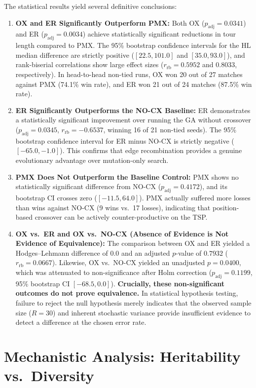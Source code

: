 \documentclass[10pt,a4paper]{article}
\begin{document}
The statistical results yield several definitive conclusions:
\begin{enumerate}
    \item \textbf{OX and ER Significantly Outperform PMX:} Both OX ($p_{\text{adj}} = 0.0341$) and ER ($p_{\text{adj}} = 0.0034$) achieve statistically significant reductions in tour length compared to PMX. The 95\% bootstrap confidence intervals for the HL median difference are strictly positive ($[22.5, 101.0]$ and $[35.0, 93.0]$), and rank-biserial correlations show large effect sizes ($r_{\text{rb}} = 0.5952$ and $0.8033$, respectively). In head-to-head non-tied runs, OX won 20 out of 27 matches against PMX (74.1\% win rate), and ER won 21 out of 24 matches (87.5\% win rate).
    \item \textbf{ER Significantly Outperforms the NO-CX Baseline:} ER demonstrates a statistically significant improvement over running the GA without crossover ($p_{\text{adj}} = 0.0345$, $r_{\text{rb}} = -0.6537$, winning 16 of 21 non-tied seeds). The 95\% bootstrap confidence interval for ER minus NO-CX is strictly negative ($[-65.0, -1.0]$). This confirms that edge recombination provides a genuine evolutionary advantage over mutation-only search.
    \item \textbf{PMX Does Not Outperform the Baseline Control:} PMX shows no statistically significant difference from NO-CX ($p_{\text{adj}} = 0.4172$), and its bootstrap CI crosses zero ($[-11.5, 64.0]$). PMX actually suffered more losses than wins against NO-CX (9 wins vs.~17 losses), indicating that position-based crossover can be actively counter-productive on the TSP.
    \item \textbf{OX vs.~ER and OX vs.~NO-CX (Absence of Evidence is Not Evidence of Equivalence):} The comparison between OX and ER yielded a Hodges--Lehmann difference of $0.0$ and an adjusted $p$-value of $0.7932$ ($r_{\text{rb}} = 0.0667$). Likewise, OX vs.~NO-CX yielded an unadjusted $p = 0.0400$, which was attenuated to non-significance after Holm correction ($p_{\text{adj}} = 0.1199$, 95\% bootstrap CI $[-68.5, 0.0]$). \textbf{Crucially, these non-significant outcomes do not prove equivalence.} In statistical hypothesis testing, failure to reject the null hypothesis merely indicates that the observed sample size ($R=30$) and inherent stochastic variance provide insufficient evidence to detect a difference at the chosen error rate.
\end{enumerate}

\section{Mechanistic Analysis: Heritability vs.~Diversity}
\label{sec:mechanism}
\end{document}
